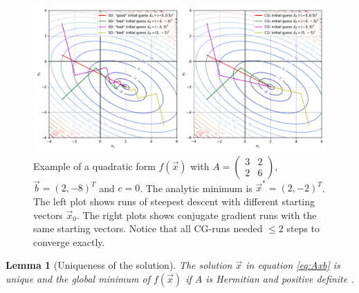 \documentclass{article}
\theoremstyle{plain} %
\newtheorem{lemma}[theorem]{Lemma}
\theoremstyle{convention} %
\theoremstyle{remark} %
\numberwithin{equation}{section}
\begin{document}
\begin{figure}
    \centering
    \includegraphics[width=1.0\textwidth]{plots/qform_contour}
    \caption{Example of a quadratic form $f(\vec{x})$ with $A = \begin{pmatrix}
        3 & 2 \\
        2 & 6
    \end{pmatrix}$, $\vec{b} = (2, -8)^T$ and $c=0$. The analytic minimum is $\vec{x}^{*} = (2, -2)^T$. The left plot shows runs of steepest descent with different starting vectors $\vec{x}_0$. The right plots shows conjugate gradient runs with the same starting vectors. Notice that all CG-runs needed $\le 2$ steps to converge exactly.}
    \label{fig:qform}
\end{figure}

\begin{lemma}[Uniqueness of the solution]
The solution $\vec{x}$ in equation \eqref{eq:Axb} is unique and the global minimum of $f(\vec{x})$ if $A$ is Hermitian and positive definite \footnotemark.
\end{lemma}

\end{document}
